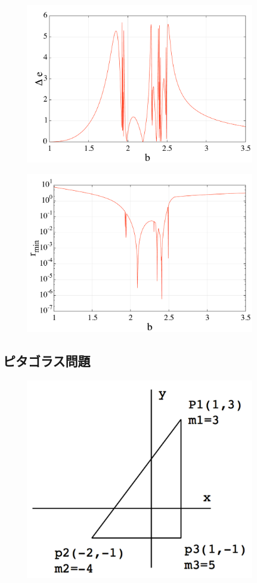 \documentclass[11pt,a4paper,oneside,onecolumn]{jarticle}
\begin{document}
\begin{figure}[H]
\centering
\includegraphics[width=10cm]{./image/planetesimal_delta_e.pdf}
\caption{\label{}}
\end{figure}

\begin{figure}[H]
\centering
\includegraphics[width=10cm]{./image/planetesimal_r_min.pdf}
\caption{\label{}}
\end{figure}

\subsection{ピタゴラス問題}

\begin{figure}[H]
\centering
\includegraphics[width=10cm]{./image/pythagoras_1.pdf}
\caption{\label{}}
\end{figure}
\end{document}
